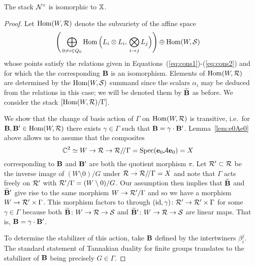 \documentclass{amsart}
\theoremstyle{definition}
\begin{document}
\begin{theorem}\label{thm:tannaka}
The stack ${\mathcal{N}}^\circ$ is isomorphic to $\mathbb{X}$.
\end{theorem}

\begin{proof}
Let $\operatorname{Hom}(W, \mathcal{R})$ denote the subvariety of the affine space $$\Bigg(\bigoplus_{0\neq i \in Q_0} \operatorname{Hom}\Big(L_i \otimes L_i,\, \bigotimes_{i \rightarrow j} L_j\Big) \Bigg) \oplus \operatorname{Hom}(W,\mathcal{S})$$ whose points satisfy the relations given in Equations~(\ref{eq:cons1})-(\ref{eq:cons2}) and for which the the corresponding $\mathbf{B}$ is an isomorphism.
Elements of $\operatorname{Hom}(W, \mathcal{R})$ are determined by the $\operatorname{Hom}(W,\mathcal{S})$ summand since the scalars $\alpha_i$ may be deduced from the relations in this case; we will be denoted them by $\widetilde{\mathbf{B}}$ as before.
We consider the stack $[\operatorname{Hom}(W,\mathcal{R})/\Gamma]$.

We show that the change of basis action of $\Gamma$ on $\operatorname{Hom}(W,\mathcal{R})$ is transitive, i.e.\  for $\mathbf{B}, \mathbf{B}' \in \operatorname{Hom}(W,\mathcal{R})$ there exists $\gamma \in \Gamma$ such that $\mathbf{B} = \gamma \cdot \mathbf{B}'$.
Lemma~\ref{lem:e0Ae0} above allows us to assume that the composites  
$$\mathbb{C}^2 \simeq W \rightarrow \mathcal{R} \rightarrow \mathcal{R} / \! /_{} \Gamma = \operatorname{Spec}(\mathbf{e}_0 \mathcal{A} \mathbf{e}_0) = X$$
corresponding to $\mathbf{B}$ and $\mathbf{B}'$ are both the quotient morphism $\pi$.
Let $\mathcal{R}' \subset \mathcal{R}$ be the inverse image of $(W \setminus 0) / G$ under  $\mathcal{R} \rightarrow \mathcal{R} / \! /_{} \Gamma = X$ and note that $\Gamma$ acts freely on $\mathcal{R}'$ with $\mathcal{R}' / \Gamma = (W \setminus 0) / G$.
Our assumption then implies that $\widetilde{\mathbf{B}}$ and $\widetilde{\mathbf{B}}'$ give rise to the same morphism $W \rightarrow \mathcal{R}'/\Gamma$ and so we have a morphism $W \rightarrow \mathcal{R}' \times \Gamma$.
This morphism factors to through $(\operatorname{id}, \gamma) \colon \mathcal{R}' \rightarrow \mathcal{R}' \times \Gamma$ for some $\gamma \in \Gamma$ because both $\widetilde{\mathbf{B}} \colon W \rightarrow \mathcal{R} \rightarrow \mathcal{S}$ and $\widetilde{\mathbf{B}}' \colon W \rightarrow \mathcal{R} \rightarrow \mathcal{S}$ are linear maps.
That is, $\mathbf{B} = \gamma \cdot \mathbf{B}'$.

To determine the stabilizer of this action, take $\mathbf{B}$ defined by the intertwiners $\beta_i^j$.
The standard statement of Tannakian duality for finite groups translates to the stabilizer of $\mathbf{B}$ being precisely $G \in \Gamma$.


\end{proof}
\end{document}
